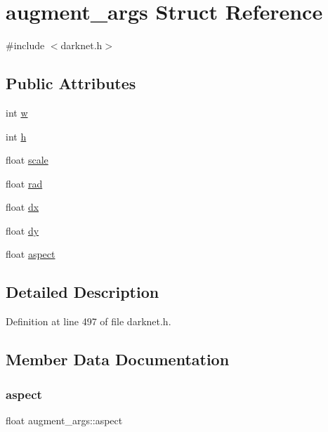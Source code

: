 \hypertarget{structaugment__args}{}\section{augment\+\_\+args Struct Reference}
\label{structaugment__args}


{\ttfamily \#include $<$darknet.\+h$>$}

\subsection*{Public Attributes}
\begin{DoxyCompactItemize}
\item 
int \mbox{\hyperlink{structaugment__args_a974bba52935c8bd5e95a306d1bd88acd}{w}}
\item 
int \mbox{\hyperlink{structaugment__args_afb11ad51cc544deb41ef00c118869612}{h}}
\item 
float \mbox{\hyperlink{structaugment__args_a3bbc9156f890de21ce14876c552baaf2}{scale}}
\item 
float \mbox{\hyperlink{structaugment__args_ad40390f9fe68f5079f95789b6673b2e9}{rad}}
\item 
float \mbox{\hyperlink{structaugment__args_a74675af1ca9ba9cfc2f97da65fad1ff7}{dx}}
\item 
float \mbox{\hyperlink{structaugment__args_aee2e7812e750cd312082426e3a2fc7a2}{dy}}
\item 
float \mbox{\hyperlink{structaugment__args_aa5494cb275d1704ac87f9c6eca904453}{aspect}}
\end{DoxyCompactItemize}


\subsection{Detailed Description}


Definition at line 497 of file darknet.\+h.



\subsection{Member Data Documentation}
\mbox{\label{structaugment__args_aa5494cb275d1704ac87f9c6eca904453}} 
\subsubsection{\texorpdfstring{aspect}{aspect}}
{\footnotesize\ttfamily float augment\+\_\+args\+::aspect}



